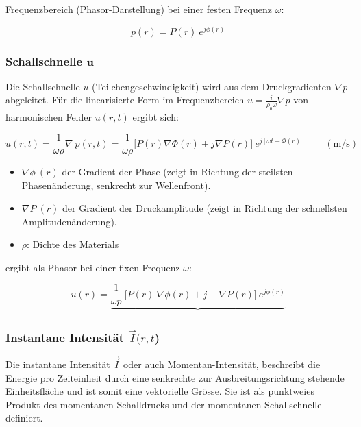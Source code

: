 Frequenzbereich (Phasor-Darstellung) bei einer festen Frequenz $\omega$:

\begin{equation}
p(r) = P(r) \: e^{j \phi (r)}
\label{helmholtz:PhasorSchalldruck}
\end{equation}

\subsubsection{Schallschnelle  $\mathbf{u}$}
Die Schallschnelle $u$ (Teilchengeschwindigkeit) wird aus dem Druckgradienten $\nabla p$ abgeleitet. Für die linearisierte Form im Frequenzbereich $ u = \frac{i}{\rho_0 \omega} \nabla p$ von harmonischen Felder $u(r,t)$  ergibt sich:

\begin{equation}
u(r,t) = \frac{1}{\omega \rho} \nabla \: p(r,t) = \frac{1}{\omega \rho} \bigg[ P(r) \nabla \Phi(r) + j\nabla P(r)  \bigg] \: e^{j[\omega t -\Phi(r)]} \qquad (\si{\metre / \second})
\end{equation}

\begin{itemize}
\item $\nabla \phi \: (r)$ der Gradient der Phase (zeigt in Richtung der steilsten Phasenänderung, senkrecht zur Wellenfront).
\item $\nabla P \:(r)$ der Gradient der Druckamplitude (zeigt in Richtung der schnellsten Amplitudenänderung).
\item $\rho$: Dichte des Materials
\end{itemize}

ergibt als Phasor bei einer fixen Frequenz $\omega$:

\begin{equation}
u(r) = \underbrace{\frac{1}{\omega p} \: \bigg[ P(r) \: \nabla \phi(r) + j - \nabla P(r) \bigg] \: e^{j\phi (r)}}_{}
\label{helmholtz:PhasorSchallschnelle}
\end{equation}

\subsubsection{Instantane Intensität $\vec{I} (r, t$)}

Die instantane Intensität $\vec{I}$ oder auch Momentan-Intensität, beschreibt die Energie pro Zeiteinheit durch eine senkrechte zur Ausbreitungsrichtung stehende Einheitsfläche und ist somit eine vektorielle Grösse. Sie ist als punktweies Produkt des momentanen Schalldrucks und der momentanen Schallschnelle definiert.

